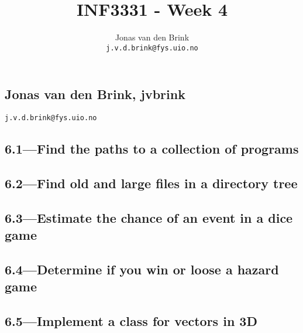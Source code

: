 \documentclass[a4paper, 11pt, titlepage, english]{article}
\title{INF3331 - Week 4}
\author{Jonas van den Brink \\ \texttt{j.v.d.brink@fys.uio.no}}
\begin{document}
\pagestyle{empty}
\subsection*{Jonas van den Brink, jvbrink}
\texttt{j.v.d.brink@fys.uio.no}
\subsection*{6.1---Find the paths to a collection of programs}

\clearpage
\subsection*{6.2---Find old and large files in a directory tree}
% 
\clearpage
\subsection*{6.3---Estimate the chance of an event in a dice game}

\clearpage
\subsection*{6.4---Determine if you win or loose a hazard game}

\clearpage
\subsection*{6.5---Implement a class for vectors in 3D}

\end{document}
